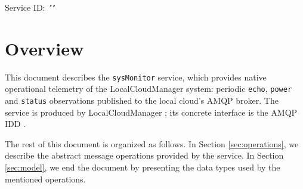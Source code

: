 \documentclass[a4paper]{arrowhead}
\begin{document}
\sloppy

\ArrowheadSetup

\begin{center}
  \vspace*{1cm}
  \huge{\arrowtitle}

  \vspace*{0.2cm}
  \LARGE{\arrowtype}
  \vspace*{1cm}

  \Large{Service ID: \textit{"\arrowid"}}

  \vspace*{\fill}


  \vspace*{1cm}
  \vspace*{\fill}

  \begin{abstract}
    This document describes the native \texttt{sysMonitor} service, version 1.0.0, produced by the LocalCloudManager support system of Arrowhead 5.2.2.
  \end{abstract}

  \vspace*{1cm}
\end{center}

\newpage

\tableofcontents
\newpage

\section{Overview}
\label{sec:overview}

This document describes the \texttt{sysMonitor} service, which provides native operational telemetry of the LocalCloudManager system: periodic \texttt{echo}, \texttt{power} and \texttt{status} observations published to the local cloud's AMQP broker.
The service is produced by LocalCloudManager \cite{lcm-sysd}; its concrete interface is the AMQP IDD \cite{lcm-sysMonitor-amqp-idd}.

The rest of this document is organized as follows.
In Section \ref{sec:operations}, we describe the abstract message operations provided by the service.
In Section \ref{sec:model}, we end the document by presenting the data types used by the mentioned operations.
\end{document}
